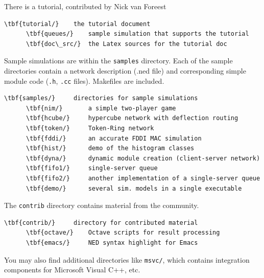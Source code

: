 There is a tutorial, contributed by Nick van Foreest

\begin{Verbatim}[commandchars=\\\{\}]
    \tbf{tutorial/}    the tutorial document
      \tbf{queues/}    sample simulation that supports the tutorial
      \tbf{doc\_src/}  the Latex sources for the tutorial doc
\end{Verbatim}

Sample simulations are within the \texttt{samples} directory. Each of the
sample directories contain a network description (.ned file) and
corresponding simple module code (\texttt{.h}, \texttt{.cc} files).
Makefiles are included.

\begin{Verbatim}[commandchars=\\\{\}]
    \tbf{samples/}     directories for sample simulations
      \tbf{nim/}       a simple two-player game
      \tbf{hcube/}     hypercube network with deflection routing
      \tbf{token/}     Token-Ring network
      \tbf{fddi/}      an accurate FDDI MAC simulation
      \tbf{hist/}      demo of the histogram classes
      \tbf{dyna/}      dynamic module creation (client-server network)
      \tbf{fifo1/}     single-server queue
      \tbf{fifo2/}     another implementation of a single-server queue
      \tbf{demo/}      several sim. models in a single executable
\end{Verbatim}


The \texttt{contrib} directory contains material from the {\opp} community.

\begin{Verbatim}[commandchars=\\\{\}]
    \tbf{contrib/}     directory for contributed material
      \tbf{octave/}    Octave scripts for result processing
      \tbf{emacs/}     NED syntax highlight for Emacs
\end{Verbatim}

You may also find additional directories like \texttt{msvc/}, which contains
integration components for Microsoft Visual C++, etc.


